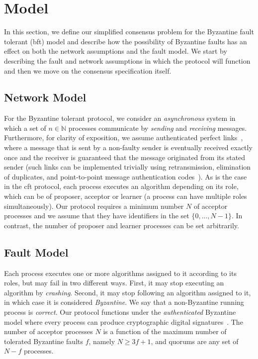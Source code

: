 \section{Model} \label{bft_model}

In this section, we define our simplified consensus problem for the Byzantine fault tolerant (\acrshort{bft}) model and describe how the possibility of Byzantine faults has an effect on both the network assumptions and the fault model. We start by describing the fault and network assumptions in which the protocol will function and then we move on the consensus specification itself.

\subsection{Network Model}
For the Byzantine tolerant protocol, we consider an \emph{asynchronous} system in which a set of $n \in \mathbb{N}$ processes communicate by \emph{sending} and \emph{receiving} messages. Furthermore, for clarity of exposition, we assume authenticated perfect links~\cite{cgr:book}, where a message that is sent by a non-faulty sender is eventually received exactly once and the receiver is guaranteed that the message originated from its stated sender (such links can be implemented trivially using retransmission, elimination of duplicates, and point-to-point message authentication codes~\cite{cgr:book}). As is the case in the \acrshort{cft} protocol, each process executes an algorithm depending on its role, which can be of proposer, acceptor or learner (a process can have multiple roles simultaneously). Our protocol requires a minimum number $N$ of acceptor processes and we assume that they have identifiers in the set $\{0,...,N-1\}$. In contrast, the number of proposer and learner processes can be set arbitrarily.

\subsection{Fault Model}
Each process executes one or more algorithms assigned to it according to its roles, but may fail in two different ways. First, it may stop executing an algorithm by \emph{crashing}. Second, it may stop following an algorithm assigned to it, in which case it is considered \emph{Byzantine}. We say that a non-Byzantine running process is \emph{correct}. Our protocol functions under the \emph{authenticated} Byzantine model where every process can produce cryptographic digital signatures~\cite{vukolic2012quorum}. The number of acceptor processes $N$ is a function of the maximum number of tolerated Byzantine faults $f$, namely $N \ge 3f+1$, and quorums are any set of $N-f$ processes. 

